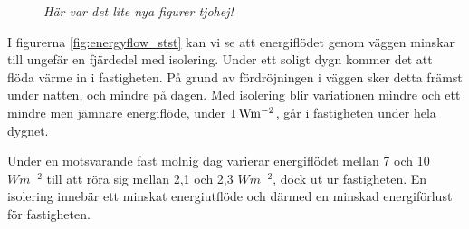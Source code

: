 \begin{figure}
\centering
{}

\caption{\emph{\color{red} Här var det lite nya figurer tjohej!}}
\end{figure}

I figurerna \ref{fig:energyflow_stst} kan vi se att energiflödet genom väggen minskar till 
ungefär en fjärdedel med isolering. Under ett soligt dygn kommer det att flöda värme in i
 fastigheten. På grund av fördröjningen i väggen sker detta främst under natten, 
 och mindre på dagen. Med isolering blir variationen mindre och ett mindre men jämnare 
 energiflöde, under $\unit[1]{W m^{-2}}$, går i fastigheten under hela dygnet.

Under en motsvarande fast molnig dag varierar energiflödet mellan 7 och 10 
$\unit{W m^{-2}}$ till att röra sig mellan 2,1 och 2,3 $\unit{W m^{-2}}$, dock ut ur 
fastigheten. En isolering innebär ett minskat energiutflöde och därmed en minskad 
energiförlust för fastigheten.


